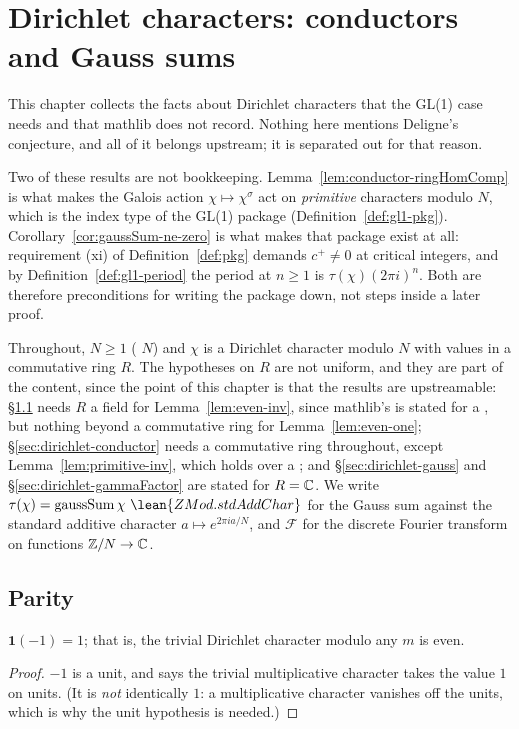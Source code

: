 \chapter{Dirichlet characters: conductors and Gauss sums}
\label{chap:dirichlet}

This chapter collects the facts about Dirichlet characters that the GL(1) case needs and
that mathlib does not record. Nothing here mentions Deligne's conjecture, and all of it
belongs upstream; it is separated out for that reason.

Two of these results are not bookkeeping. Lemma~\ref{lem:conductor-ringHomComp} is what
makes the Galois action $\chi \mapsto \chi^{\sigma}$ act on \emph{primitive} characters
modulo $N$, which is the index type of the GL(1) package
(Definition~\ref{def:gl1-pkg}). Corollary~\ref{cor:gaussSum-ne-zero} is what makes
that package exist at all: requirement (xi) of Definition~\ref{def:pkg} demands
$c^{+} \neq 0$ at critical integers, and by Definition~\ref{def:gl1-period} the period at
$n \geq 1$ is $\tau(\chi)(2\pi i)^{n}$. Both are therefore preconditions for writing the
package down, not steps inside a later proof.

Throughout, $N \geq 1$ ( $N$) and $\chi$ is a Dirichlet character modulo $N$
with values in a commutative ring $R$. The hypotheses on $R$ are not uniform, and they are
part of the content, since the point of this chapter is that the results are upstreamable:
\S\ref{sec:dirichlet-parity} needs $R$ a field for Lemma~\ref{lem:even-inv}, since
mathlib's  is stated for a ,
but nothing beyond a commutative ring for Lemma~\ref{lem:even-one};
\S\ref{sec:dirichlet-conductor} needs a commutative ring throughout, except
Lemma~\ref{lem:primitive-inv}, which holds over a ; and
\S\ref{sec:dirichlet-gauss} and \S\ref{sec:dirichlet-gammaFactor} are stated for
$R = \mathbb{C}$. We write
$\tau(\chi) = \operatorname{gaussSum} \chi\ \lean{ZMod.stdAddChar}$ for the Gauss sum
against the standard additive character $a \mapsto e^{2\pi i a/N}$, and $\mathcal{F}$ for
the discrete Fourier transform  on functions $\mathbb{Z}/N \to \mathbb{C}$.

\section{Parity}
\label{sec:dirichlet-parity}

\begin{lemma}
  \label{lem:even-one}
  \leanok
  $\mathbf{1}(-1) = 1$; that is, the trivial Dirichlet character modulo any $m$ is even.
\end{lemma}
\begin{proof}
  \leanok
  $-1$ is a unit, and  says the trivial multiplicative character
  takes the value $1$ on units. (It is \emph{not} identically $1$: a multiplicative
  character vanishes off the units, which is why the unit hypothesis is needed.)
\end{proof}

